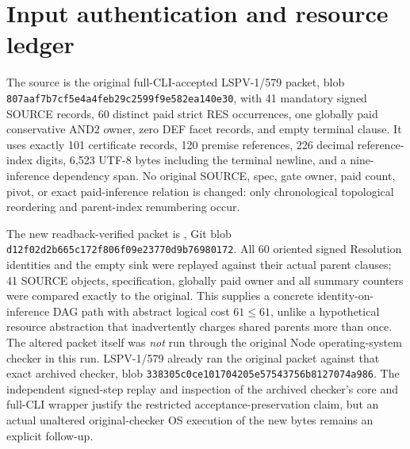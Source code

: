 \documentclass[11pt]{article}
\begin{document}
\section*{Input authentication and resource ledger}
The source is the original full-CLI-accepted LSPV-1/579 packet, blob \texttt{807aaf7b7cf5e4a4feb29c2599f9e582ea140e30}, with 41 mandatory signed SOURCE records, 60 distinct paid strict RES occurrences, one globally paid conservative AND2 owner, zero DEF facet records, and empty terminal clause. It uses exactly 101 certificate records, 120 premise references, 226 decimal reference-index digits, 6,523 UTF-8 bytes including the terminal newline, and a nine-inference dependency span. No original SOURCE, spec, gate owner, paid count, pivot, or exact paid-inference relation is changed: only chronological topological reordering and parent-index renumbering occur.

The new readback-verified packet is , Git blob \texttt{d12f02d2b665c172f806f09e23770d9b76980172}. All 60 oriented signed Resolution identities and the empty sink were replayed against their actual parent clauses; 41 SOURCE objects, specification, globally paid owner and all summary counters were compared exactly to the original. This supplies a concrete identity-on-inference DAG path with abstract logical cost $61\leq61$, unlike a hypothetical resource abstraction that inadvertently charges shared parents more than once. The altered packet itself was \emph{not} run through the original Node operating-system checker in this run. LSPV-1/579 already ran the original packet against that exact archived checker, blob \texttt{338305c0ce101704205e57543756b8127074a986}. The independent signed-step replay and inspection of the archived checker's core and full-CLI wrapper justify the restricted acceptance-preservation claim, but an actual unaltered original-checker OS execution of the new bytes remains an explicit follow-up.
\end{document}
